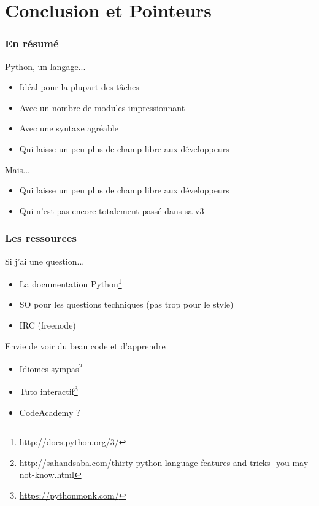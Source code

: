 \documentclass{beamer}
\begin{document}
\section{Conclusion et Pointeurs}
\label{sec:conclusion}

\begin{frame}
  \frametitle{En résumé}

  \begin{block}{Python, un langage...}
    \begin{itemize}
    \item Idéal pour la plupart des tâches
    \item Avec un nombre de modules impressionnant
    \item Avec une syntaxe agréable
    \item Qui laisse un peu plus de champ libre aux développeurs
    \end{itemize}
  \end{block}

  \pause

  \begin{block}{Mais...}
    \begin{itemize}
    \item Qui laisse un peu plus de champ libre aux développeurs
    \item Qui n'est pas encore totalement passé dans sa v3
    \end{itemize}
  \end{block}

\end{frame}

\begin{frame}
  \frametitle{Les ressources}

  \begin{block}{Si j'ai une question...}
    \begin{itemize}
    \item La documentation
      Python\footnote{\url{http://docs.python.org/3/}}
    \item SO pour les questions techniques (pas trop pour le style)
    \item IRC (freenode)
    \end{itemize}
  \end{block}

  \pause

  \begin{block}{Envie de voir du beau code et d'apprendre}
    \begin{itemize}
    \item Idiomes sympas\footnote{http://sahandsaba.com/thirty-python-language-features-and-tricks -you-may-not-know.html}
    \item Tuto interactif\footnote{\url{https://pythonmonk.com/}}
    \item CodeAcademy ?
   \end{itemize}
  \end{block}
\end{frame}
\end{document}
